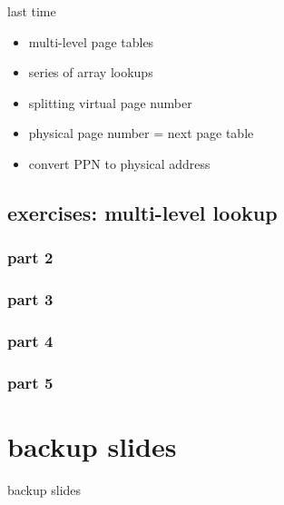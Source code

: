 \date{}
\title{}
\date{}

\begin{frame}
    \titlepage
\end{frame}




\begin{frame}{last time}
    \begin{itemize}
    \item multi-level page tables
    \item series of array lookups
    \item splitting virtual page number
    \item physical page number = next page table
    \item convert PPN to physical address
    \end{itemize}
\end{frame}

\subsection{exercises: multi-level lookup}
\subsubsection{part 2}

\subsubsection{part 3}


\subsubsection{part 4}

\subsubsection{part 5}



\section{backup slides}
\begin{frame}{backup slides}
\end{frame}
%



